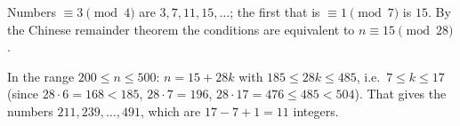 Numbers $\equiv3\pmod4$ are $3,7,11,15,\dots$; the first that is $\equiv1\pmod7$ is $15$. By the Chinese remainder theorem the conditions are equivalent to $n\equiv15\pmod{28}$.

In the range $200\le n\le500$: $n=15+28k$ with $185\le28k\le485$, i.e.\ $7\le k\le17$ (since $28\cdot6=168<185$, $28\cdot7=196$, $28\cdot17=476\le485<504$). That gives the numbers $211,239,\dots,491$, which are $17-7+1=\boxed{11}$ integers.
